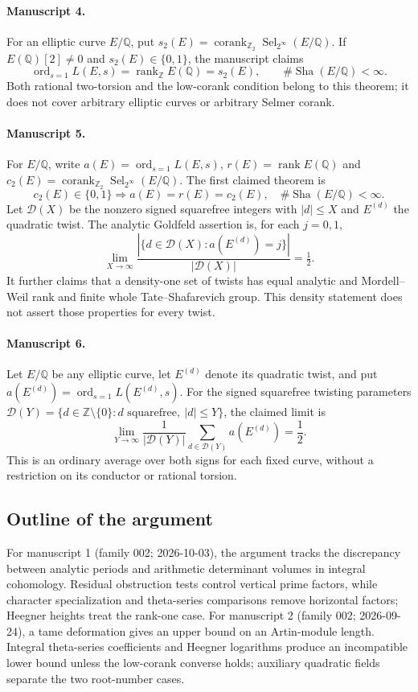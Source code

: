 \documentclass[11pt]{article}
\begin{document}
\paragraph{Manuscript 4.}
For an elliptic curve $E/\mathbb Q$, put $s_2(E)=\operatorname{corank}_{\mathbb Z_2}\operatorname{Sel}_{2^{\infty}}(E/\mathbb Q)$. If $E(\mathbb Q)[2]\ne0$ and $s_2(E)\in\{0,1\}$, the manuscript claims
\[
 \operatorname{ord}_{s=1}L(E,s)=\operatorname{rank}_{\mathbb Z}E(\mathbb Q)=s_2(E),\qquad
 \#\operatorname{Sha}(E/\mathbb Q)<\infty.
\]
Both rational two-torsion and the low-corank condition belong to this theorem; it does not cover arbitrary elliptic curves or arbitrary Selmer corank.

\paragraph{Manuscript 5.}
For $E/\mathbb Q$, write $a(E)=\operatorname{ord}_{s=1}L(E,s)$, $r(E)=\operatorname{rank}E(\mathbb Q)$ and $c_2(E)=\operatorname{corank}_{\mathbb Z_2}\operatorname{Sel}_{2^{\infty}}(E/\mathbb Q)$. The first claimed theorem is
\[
 c_2(E)\in\{0,1\}\Rightarrow a(E)=r(E)=c_2(E),\quad\#\operatorname{Sha}(E/\mathbb Q)<\infty.
\]
Let $\mathcal D(X)$ be the nonzero signed squarefree integers with $|d|\le X$ and $E^{(d)}$ the quadratic twist. The analytic Goldfeld assertion is, for each $j=0,1$,
\[
 \lim_{X\to\infty}\frac{|\{d\in\mathcal D(X):a(E^{(d)})=j\}|}{|\mathcal D(X)|}=\tfrac12.
\]
It further claims that a density-one set of twists has equal analytic and Mordell--Weil rank and finite whole Tate--Shafarevich group. This density statement does not assert those properties for every twist.

\paragraph{Manuscript 6.}
Let $E/\mathbb Q$ be any elliptic curve, let $E^{(d)}$ denote its quadratic twist, and put $a(E^{(d)})=\operatorname{ord}_{s=1}L(E^{(d)},s)$. For the signed squarefree twisting parameters $\mathcal D(Y)=\{d\in\mathbb Z\setminus\{0\}:d\text{ squarefree},\ |d|\le Y\}$, the claimed limit is
\[
 \lim_{Y\to\infty}\frac1{|\mathcal D(Y)|}
       \sum_{d\in\mathcal D(Y)}a(E^{(d)})=\frac12.
\]
This is an ordinary average over both signs for each fixed curve, without a restriction on its conductor or rational torsion.

\subsection{Outline of the argument}
For manuscript 1 (family 002; 2026-10-03), the argument tracks the discrepancy between analytic periods and arithmetic determinant volumes in integral cohomology. Residual obstruction tests control vertical prime factors, while character specialization and theta-series comparisons remove horizontal factors; Heegner heights treat the rank-one case. For manuscript 2 (family 002; 2026-09-24), a tame deformation gives an upper bound on an Artin-module length. Integral theta-series coefficients and Heegner logarithms produce an incompatible lower bound unless the low-corank converse holds; auxiliary quadratic fields separate the two root-number cases.
\end{document}
